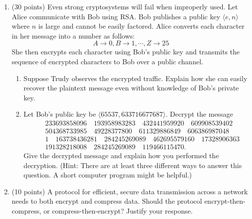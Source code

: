 \documentclass[letterpaper]{article}
\begin{document}
\begin{enumerate}
\item (30 points) Even strong cryptosystems will fail when improperly used. Let Alice communicate with Bob using RSA. Bob publishes a public key $\langle e, n \rangle$ where $n$ is large and cannot be easily factored. Alice converts each character in her message into a number as follows:
\begin{displaymath}
A \to 0, B \to 1, \cdots, Z \to 25
\end{displaymath}
She then encrypts each character using Bob's public key and transmits the sequence of encrypted characters to Bob over a public channel.
\begin{enumerate}
\item Suppose Trudy observes the encrypted traffic. Explain how she can easily recover the plaintext message even without knowledge of Bob's private key.
\item Let Bob's public key be $\langle 65537, 633716677687 \rangle$. Decrypt the message
\begin{eqnarray*}
&&233693858096\quad 193958983283\quad 432441959920\quad 609908539402\\ &&504368733985\quad 49228377800\quad 611329886849\quad 606386987048\\
&&1\quad 163738436281\quad 284245269089\quad 462695579160\quad 17328906363\\
&&191328218008\quad 284245269089\quad 119466115470.
\end{eqnarray*}
Give the decrypted message and explain how you performed the decryption. (Hint: There are at least three different ways to answer this question. A short computer program might be helpful.)
\end{enumerate}

\item (10 points) A protocol for efficient, secure data transmission across a network needs to both encrypt and compress data. Should the protocol encrypt-then-compress, or compress-then-encrypt? Justify your response.

\end{enumerate}
\end{document}
